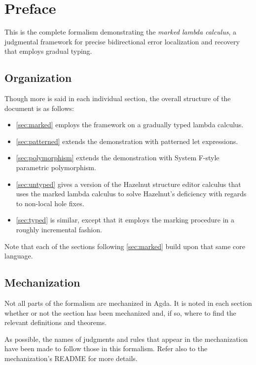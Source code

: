 \documentclass[formalism.tex]{subfiles}
\begin{document}
\section{Preface}
\label{sec:preface}
This is the complete formalism demonstrating the \emph{marked lambda calculus}, a judgmental framework for
precise bidirectional error localization and recovery that employs gradual typing.

\subsection{Organization}
Though more is said in each individual section, the overall structure of the document is as follows:
%
\begin{itemize}
  \item \cref{sec:marked} employs the framework on a gradually typed lambda calculus.

  \item \cref{sec:patterned} extends the demonstration with patterned let expressions.

  \item \cref{sec:polymorphism} extends the demonstration with System F-style parametric
    polymorphism.

  \item \cref{sec:untyped} gives a version of the Hazelnut structure editor calculus that uses the
    marked lambda calculus to solve Hazelnut's deficiency with regards to non-local hole fixes.

  \item \cref{sec:typed} is similar, except that it employs the marking procedure in a roughly
    incremental fashion.
\end{itemize}
%
Note that each of the sections following \cref{sec:marked} build upon that same core language.

\subsection{Mechanization}
Not all parts of the formalism are mechanized in Agda. It is noted in each section whether or not
the section has been mechanized and, if so, where to find the relevant definitions and theorems.

As possible, the names of judgments and rules that appear in the mechanization have been made to
follow those in this formalism. Refer also to the mechanization's README for more details.
\end{document}
